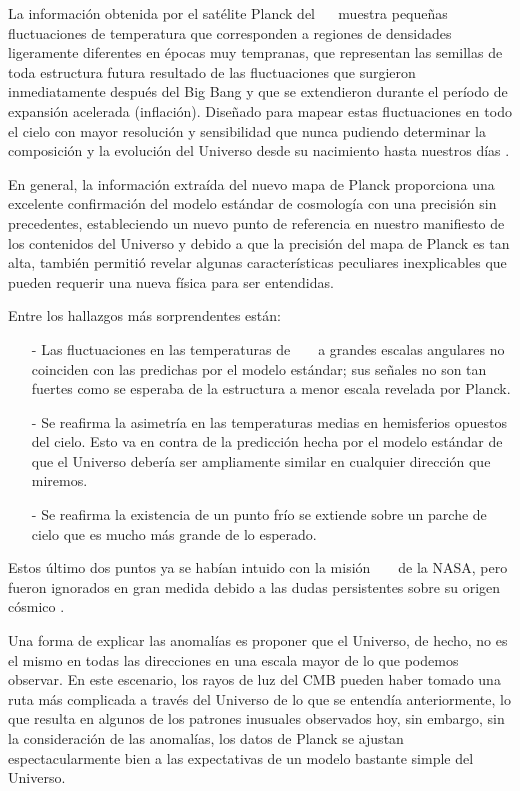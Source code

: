 La información obtenida por el satélite Planck del ~\CMB~ muestra pequeñas fluctuaciones de temperatura que corresponden a regiones de densidades ligeramente diferentes en épocas muy tempranas, que representan las semillas de toda estructura futura resultado de las fluctuaciones que surgieron inmediatamente después del Big Bang y que se extendieron durante el período de expansión acelerada (inflación). Diseñado para mapear estas fluctuaciones en todo el cielo con mayor resolución y sensibilidad que nunca pudiendo determinar la composición y la evolución del Universo desde su nacimiento hasta nuestros días \citep{planck_collaboration_planck_2019}.

En general, la información extraída del nuevo mapa de Planck proporciona una excelente confirmación del modelo estándar de cosmología con una precisión sin precedentes, estableciendo un nuevo punto de referencia en nuestro manifiesto de los contenidos del Universo y debido a que la precisión del mapa de Planck es tan alta, también permitió revelar algunas características peculiares inexplicables que pueden requerir una nueva física para ser entendidas.

Entre los hallazgos más sorprendentes están:
\begin{itemize}
\item[-] Las fluctuaciones en las temperaturas de ~ \CMB ~ a grandes escalas angulares no coinciden con las predichas por el modelo estándar; sus señales no son tan fuertes como se esperaba de la estructura a menor escala revelada por Planck.
\item[-] Se reafirma la asimetría en las temperaturas medias en hemisferios opuestos del cielo. Esto va en contra de la predicción hecha por el modelo estándar de que el Universo debería ser ampliamente similar en cualquier dirección que miremos.
\item[-] Se reafirma la existencia de un punto frío se extiende sobre un parche de cielo que es mucho más grande de lo esperado.
\end{itemize}
Estos último dos puntos ya se habían intuido con la misión ~ \WMAP ~ de la NASA, pero fueron ignorados en gran medida debido a las dudas persistentes sobre su origen cósmico \citep{planck_collaboration_planck_2019}.

Una forma de explicar las anomalías es proponer que el Universo, de hecho, no es el mismo en todas las direcciones en una escala mayor de lo que podemos observar. En este escenario, los rayos de luz del CMB pueden haber tomado una ruta más complicada a través del Universo de lo que se entendía anteriormente, lo que resulta en algunos de los patrones inusuales observados hoy, sin embargo, sin la consideración de las anomalías, los datos de Planck se ajustan espectacularmente bien a las expectativas de un modelo bastante simple del Universo.

